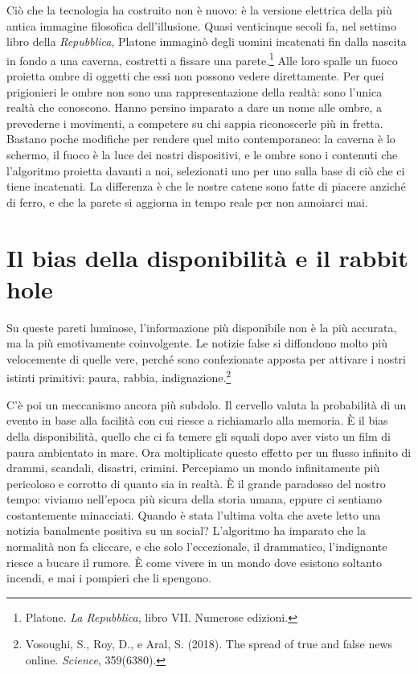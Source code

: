 Ciò che la tecnologia ha costruito non è nuovo: è la versione elettrica della più antica immagine filosofica dell'illusione. Quasi venticinque secoli fa, nel settimo libro della \textit{Repubblica}, Platone immaginò degli uomini incatenati fin dalla nascita in fondo a una caverna, costretti a fissare una parete.\footnote{Platone. \textit{La Repubblica}, libro VII. Numerose edizioni.} Alle loro spalle un fuoco proietta ombre di oggetti che essi non possono vedere direttamente. Per quei prigionieri le ombre non sono una rappresentazione della realtà: sono l'unica realtà che conoscono. Hanno persino imparato a dare un nome alle ombre, a prevederne i movimenti, a competere su chi sappia riconoscerle più in fretta. Bastano poche modifiche per rendere quel mito contemporaneo: la caverna è lo schermo, il fuoco è la luce dei nostri dispositivi, e le ombre sono i contenuti che l'algoritmo proietta davanti a noi, selezionati uno per uno sulla base di ciò che ci tiene incatenati. La differenza è che le nostre catene sono fatte di piacere anziché di ferro, e che la parete si aggiorna in tempo reale per non annoiarci mai.

\section{Il bias della disponibilità e il rabbit hole}

Su queste pareti luminose, l'informazione più disponibile non è la più accurata, ma la più emotivamente coinvolgente. Le notizie false si diffondono molto più velocemente di quelle vere, perché sono confezionate apposta per attivare i nostri istinti primitivi: paura, rabbia, indignazione.\footnote{Vosoughi, S., Roy, D., e Aral, S. (2018). The spread of true and false news online. \textit{Science}, 359(6380).}

C'è poi un meccanismo ancora più subdolo. Il cervello valuta la probabilità di un evento in base alla facilità con cui riesce a richiamarlo alla memoria. È il bias della disponibilità, quello che ci fa temere gli squali dopo aver visto un film di paura ambientato in mare. Ora moltiplicate questo effetto per un flusso infinito di drammi, scandali, disastri, crimini. Percepiamo un mondo infinitamente più pericoloso e corrotto di quanto sia in realtà. È il grande paradosso del nostro tempo: viviamo nell'epoca più sicura della storia umana, eppure ci sentiamo costantemente minacciati. Quando è stata l'ultima volta che avete letto una notizia banalmente positiva su un social? L'algoritmo ha imparato che la normalità non fa cliccare, e che solo l'eccezionale, il drammatico, l'indignante riesce a bucare il rumore. È come vivere in un mondo dove esistono soltanto incendi, e mai i pompieri che li spengono.

